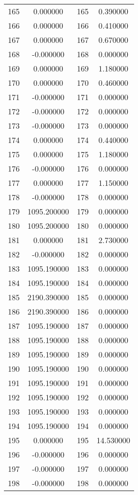 \documentclass[12pt]{article}
\begin{document}
\begin{longtable}{@{}cccc@{}}
165 & 0.000000 & 165 & 0.390000 \\
166 & 0.000000 & 166 & 0.410000 \\
167 & 0.000000 & 167 & 0.670000 \\
168 & -0.000000 & 168 & 0.000000 \\
169 & 0.000000 & 169 & 1.180000 \\
170 & 0.000000 & 170 & 0.460000 \\
171 & -0.000000 & 171 & 0.000000 \\
172 & -0.000000 & 172 & 0.000000 \\
173 & -0.000000 & 173 & 0.000000 \\
174 & 0.000000 & 174 & 0.440000 \\
175 & 0.000000 & 175 & 1.180000 \\
176 & -0.000000 & 176 & 0.000000 \\
177 & 0.000000 & 177 & 1.150000 \\
178 & -0.000000 & 178 & 0.000000 \\
179 & 1095.200000 & 179 & 0.000000 \\
180 & 1095.200000 & 180 & 0.000000 \\
181 & 0.000000 & 181 & 2.730000 \\
182 & -0.000000 & 182 & 0.000000 \\
183 & 1095.190000 & 183 & 0.000000 \\
184 & 1095.190000 & 184 & 0.000000 \\
185 & 2190.390000 & 185 & 0.000000 \\
186 & 2190.390000 & 186 & 0.000000 \\
187 & 1095.190000 & 187 & 0.000000 \\
188 & 1095.190000 & 188 & 0.000000 \\
189 & 1095.190000 & 189 & 0.000000 \\
190 & 1095.190000 & 190 & 0.000000 \\
191 & 1095.190000 & 191 & 0.000000 \\
192 & 1095.190000 & 192 & 0.000000 \\
193 & 1095.190000 & 193 & 0.000000 \\
194 & 1095.190000 & 194 & 0.000000 \\
195 & 0.000000 & 195 & 14.530000 \\
196 & -0.000000 & 196 & 0.000000 \\
197 & -0.000000 & 197 & 0.000000 \\
198 & -0.000000 & 198 & 0.000000 \\

\end{longtable}
\end{document}
